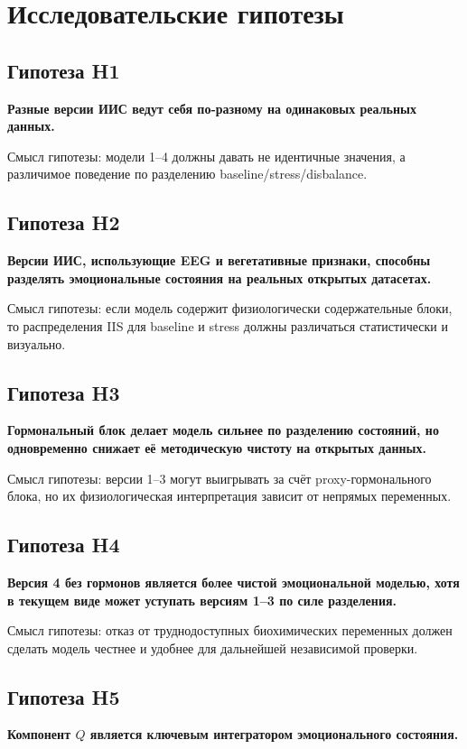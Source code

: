\documentclass[12pt,a4paper]{article}
\begin{document}
\section{Исследовательские гипотезы}
\subsection{Гипотеза H1}
\textbf{Разные версии ИИС ведут себя по-разному на одинаковых реальных данных.}

Смысл гипотезы: модели 1--4 должны давать не идентичные значения, а различимое поведение по разделению baseline/stress/disbalance.

\subsection{Гипотеза H2}
\textbf{Версии ИИС, использующие EEG и вегетативные признаки, способны разделять эмоциональные состояния на реальных открытых датасетах.}

Смысл гипотезы: если модель содержит физиологически содержательные блоки, то распределения IIS для baseline и stress должны различаться статистически и визуально.

\subsection{Гипотеза H3}
\textbf{Гормональный блок делает модель сильнее по разделению состояний, но одновременно снижает её методическую чистоту на открытых данных.}

Смысл гипотезы: версии 1--3 могут выигрывать за счёт proxy-гормонального блока, но их физиологическая интерпретация зависит от непрямых переменных.

\subsection{Гипотеза H4}
\textbf{Версия 4 без гормонов является более чистой эмоциональной моделью, хотя в текущем виде может уступать версиям 1--3 по силе разделения.}

Смысл гипотезы: отказ от труднодоступных биохимических переменных должен сделать модель честнее и удобнее для дальнейшей независимой проверки.

\subsection{Гипотеза H5}
\textbf{Компонент $Q$ является ключевым интегратором эмоционального состояния.}
\end{document}
